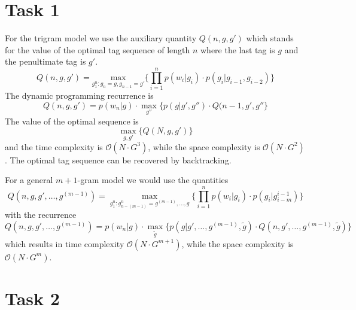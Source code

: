 \documentclass[%
   11pt,              %
   ngerman,           %
   a4paper,           %
   DIV11,             %
]{scrartcl}%
\begin{document}
\section*{Task 1}
For the trigram model we use the auxiliary quantity $Q(n,g,g')$ which stands for the value of the optimal tag sequence of length $n$ where the last tag is $g$ and the penultimate tag is $g'$.
\begin{equation*}
	Q(n,g,g') = \underset{g_1^n: g_n = g, g_{n-1}=g'}{\text{max}}\{\prod_{i=1}^n p(w_i|g_i) \cdot p(g_i|g_{i-1},g_{i-2})\}
\end{equation*}
The dynamic programming recurrence is
\begin{equation*}
	Q(n,g,g') = p(w_n|g) \cdot \underset{g''}{\max}\{p(g|g',g'') \cdot Q(n-1,g',g''\}
\end{equation*}
The value of the optimal sequence is
\begin{equation*}
	\underset{g,g'}{\max}\{Q(N,g,g')\}
\end{equation*}
and the time complexity is $\mathcal{O}(N \cdot G^3)$, while the space complexity is $\mathcal{O}(N \cdot G^2)$. The optimal tag sequence can be recovered by backtracking. \par
For a general $m+1$-gram model we would use the quantities
\begin{equation*}
	Q(n,g,g',\ldots,g^{(m-1)}) = \underset{g_1^n: g_{n-(m-1)}^n = g^{(m-1)},\ldots, g}{\max}\{\prod_{i=1}^n p(w_i|g_i) \cdot p(g_i|g_{i-m}^{i-1}) \}
\end{equation*}
with the recurrence
\begin{equation*}
	Q(n,g,g',\ldots,g^{(m-1)}) = p(w_n|g) \cdot \underset{\tilde{g}}{\max}\{p(g|g',\ldots,g^{(m-1)},\tilde{g}) \cdot Q(n,g',\ldots,g^{(m-1)},\tilde{g})\}
\end{equation*}
which results in time complexity $\mathcal{O}(N \cdot G^{m+1})$, while the space complexity is $\mathcal{O}(N \cdot G^m)$.
\section*{Task 2}
\end{document}
